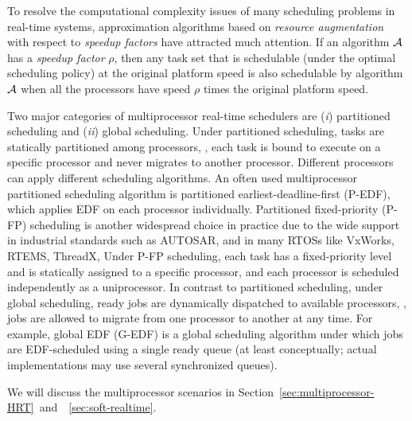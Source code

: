 To resolve the computational complexity issues of many scheduling problems in real-time systems, approximation algorithms based on \textit{resource augmentation} with respect to \emph{speedup factors} have attracted much attention.  If an algorithm ${\cal A}$ has a \emph{speedup factor} $\rho$, then any task set that is schedulable (under the optimal scheduling policy) at the original platform speed is also schedulable by algorithm ${\cal A}$ when all the processors have speed $\rho$ times the original platform speed.





Two major categories of multiprocessor real-time schedulers are  (\textit{i}) partitioned scheduling and (\textit{ii}) global scheduling. 
Under partitioned scheduling, tasks are statically partitioned among processors, \ie, each task is bound to execute on a specific processor and never migrates to another processor. Different processors can apply different scheduling algorithms. An often used multiprocessor partitioned scheduling algorithm is partitioned earliest-deadline-first (P-EDF), which applies EDF on each processor individually.
Partitioned fixed-priority (P-FP) scheduling is another widespread
choice in practice due to the wide support in industrial standards
such as AUTOSAR, and in many RTOSs like VxWorks, RTEMS, ThreadX, \etc
Under P-FP scheduling, each task has a fixed-priority level and is statically assigned to a specific processor, and each processor is scheduled independently as a uniprocessor.  
 In contrast to partitioned scheduling, under global scheduling,  ready jobs are dynamically dispatched to available processors, \ie, jobs are allowed to migrate from one processor to another at any time. For example, global EDF (G-EDF) is a global scheduling algorithm under which jobs are EDF-scheduled using a single ready queue (at least conceptually; actual implementations may use several synchronized queues).  

We will discuss the multiprocessor scenarios in Section~\ref{sec:multiprocessor-HRT}~and~\mysectionref{}~\ref{sec:soft-realtime}.



  
  
  
